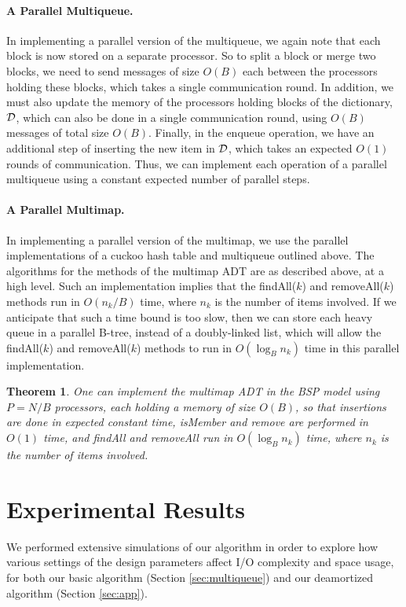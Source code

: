 \documentclass[11pt,letterpaper]{article}
\newtheorem{theorem}{Theorem}
\begin{document}
{\paragraph{A Parallel Multiqueue.}
In implementing a parallel version of the multiqueue, we again note that
each block is now stored on a separate processor.
So to split a block or merge two blocks, we need to send messages
of size $O(B)$ each
between the processors holding these blocks,
which takes a single communication round.
In addition, we must also update the memory of the processors holding
blocks of the dictionary, $\cal D$,
which can also be done in a single communication round, using $O(B)$
messages of total size $O(B)$.
Finally, in the enqueue operation, we have an additional step of
inserting the new item in $\cal D$, which takes an expected $O(1)$
rounds of communication.
Thus, we can implement each operation of a parallel multiqueue using
a constant expected number of parallel steps.

\paragraph{A Parallel Multimap.}
In implementing a parallel version of the multimap, we use the
parallel implementations of a cuckoo hash table and multiqueue
outlined above.
The algorithms for the methods of the multimap ADT are as described
above, at a high level.
Such an implementation implies that the findAll($k$) and
removeAll($k$) methods run in $O(n_k/B)$ time,
where $n_k$ is the number of items involved.
If we anticipate that such a time bound is too slow, then we can
store each heavy queue in a parallel B-tree, instead of a
doubly-linked list, which will allow the findAll($k$) and
removeAll($k$) methods to run in $O(\log_B n_k)$ time in this
parallel implementation.

\begin{theorem}
One can implement the multimap ADT in the BSP model using $P=N/B$
processors, each holding a memory of size $O(B)$, so that insertions
are done in expected constant time,
isMember and remove are performed in $O(1)$ time, and findAll and
removeAll run in $O(\log_B n_k)$ time, where $n_k$ is the number of
items involved.
\end{theorem}
}


 \section{Experimental Results}
\label{sec:experiments}
We performed extensive simulations of our algorithm in order to explore how various settings of the design parameters affect I/O complexity and space usage, for both our basic algorithm (Section \ref{sec:multiqueue}) and our deamortized algorithm (Section \ref{sec:app}).
\end{document}
